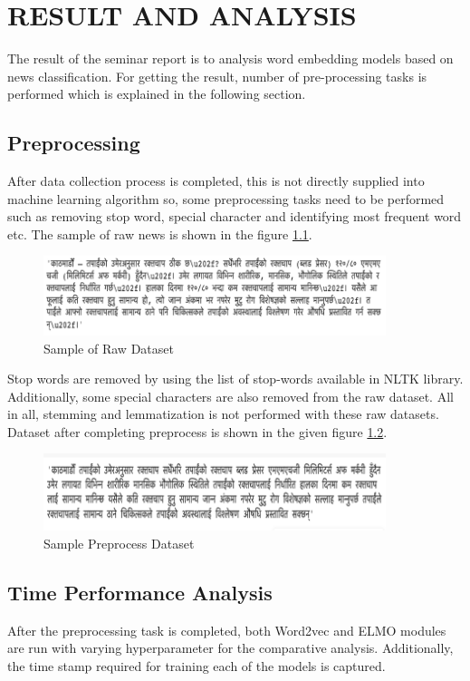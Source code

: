 \chapter{RESULT AND ANALYSIS}
The result of the seminar report is to analysis word embedding models based on news classification. For getting the result, number of pre-processing tasks is performed which is explained in the following section.
\section{Preprocessing}
After data collection process is completed, this is not directly supplied into machine learning algorithm so, some preprocessing tasks need to be performed such as removing stop word, special character and identifying most frequent word etc. The sample of raw news is shown in the figure \ref{fig: Raw_dataset}.
\begin{figure}[H]
	\centering 
	\vspace{20pt}\includegraphics[width=10cm]{images/preprocessing1.png}
	\caption{Sample of Raw Dataset} 
	\label{fig: Raw_dataset}
\end{figure}
Stop words are removed by using the list of stop-words available in NLTK library. Additionally, some special characters are also removed from the raw dataset. All in all, stemming and lemmatization is not performed with these raw datasets. Dataset after completing preprocess is shown in the given figure \ref{fig:Processed_dataset}.
\begin{figure}[H] 
	\centering 
	\vspace{20pt}\includegraphics[width=10cm]{images/preprocessing2.png}
	\caption{Sample Preprocess Dataset} 
	\label{fig:Processed_dataset}
	
\end{figure}
\section{Time Performance Analysis}
After the preprocessing task is completed, both Word2vec and ELMO modules are run with varying hyperparameter for the comparative analysis. Additionally, the time stamp required for training each of the models is captured. 

